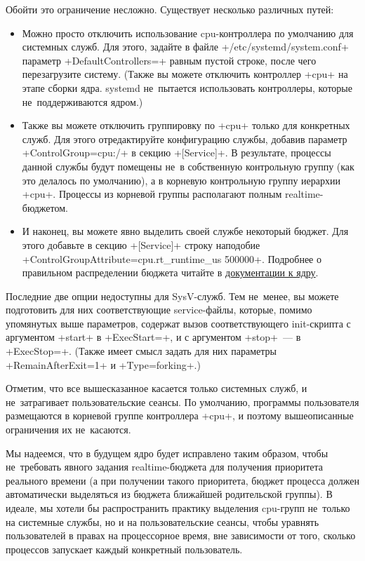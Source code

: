 \documentclass[10pt,oneside,a4paper]{article}
\begin{document}
Обойти это ограничение несложно. Существует несколько различных путей:
\begin{itemize}
	\item Можно просто отключить использование cpu-контроллера по умолчанию 
		для системных служб. Для этого, задайте в файле
		+/etc/systemd/system.conf+ параметр +DefaultControllers=+ равным
		пустой строке, после чего перезагрузите систему. (Также вы
		можете отключить контроллер +cpu+ на этапе сборки ядра. systemd
		не~пытается использовать контроллеры, которые не~поддерживаются
		ядром.)
	\item Также вы можете отключить группировку по +cpu+ только для
		конкретных служб. Для этого отредактируйте конфигурацию службы,
		добавив параметр +ControlGroup=cpu:/+ в секцию +[Service]+. В
		результате, процессы данной службы будут помещены не~в
		собственную контрольную группу (как это делалось по умолчанию),
		а в корневую контрольную группу иерархии +cpu+. Процессы из
		корневой группы располагают полным realtime-бюджетом.
	\item И наконец, вы можете явно выделить своей службе некоторый бюджет.
		Для этого добавьте в секцию +[Service]+ строку наподобие
		+ControlGroupAttribute=cpu.rt_runtime_us 500000+. Подробнее о
		правильном распределении бюджета читайте в
		\href{http://www.kernel.org/doc/Documentation/scheduler/sched-design-CFS.txt}%
		{документации к ядру}.
\end{itemize}

Последние две опции недоступны для SysV-служб. Тем не~менее, вы можете
подготовить для них соответствующие service-файлы, которые, помимо упомянутых
выше параметров, содержат вызов соответствующего init-скрипта с аргументом
+start+ в +ExecStart=+, и с аргументом +stop+~--- в +ExecStop=+.
(Также имеет смысл задать для них параметры +RemainAfterExit=1+ и
+Type=forking+.)

Отметим, что все вышесказанное касается только системных служб, и не~затрагивает
пользовательские сеансы. По умолчанию, программы пользователя размещаются в
корневой группе контроллера +cpu+, и поэтому вышеописанные ограничения их
не~касаются.

Мы надеемся, что в будущем ядро будет исправлено таким образом, чтобы
не~требовать явного задания realtime-бюджета для получения приоритета реального
времени (а при получении такого приоритета, бюджет процесса должен автоматически
выделяться из бюджета ближайшей родительской группы). В идеале, мы хотели бы
распространить практику выделения cpu-групп не~только на системные службы, но и
на пользовательские сеансы, чтобы уравнять пользователей в правах на
процессорное время, вне зависимости от того, сколько процессов запускает каждый
конкретный пользователь.
\end{document}
